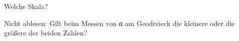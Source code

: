 \setcounter{aufgabe}{7}

\begin{aufgabe}{Welche Skala?}
\begin{teile}
\teil Nicht ablesen: Gilt beim Messen von α am Geodreieck die kleinere oder die größere der beiden Zahlen? \\  \\ 
\end{teile}
\end{aufgabe}

